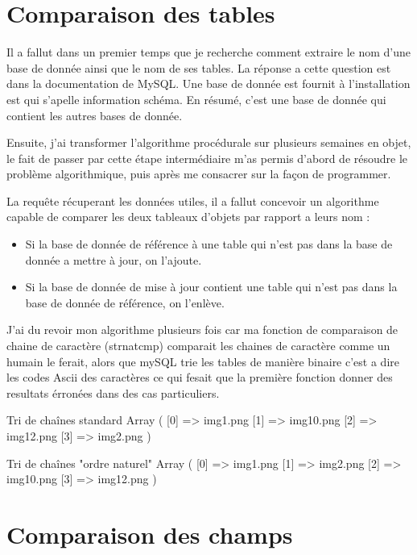 \section{Comparaison des tables}


Il a fallut dans un premier temps que je recherche comment extraire le nom
d'une base de donnée ainsi que le nom de ses tables. La réponse a cette
question est dans la documentation de MySQL. Une base de donnée est fournit à
l'installation est qui s'apelle information schéma. En résumé, c'est une base
de donnée qui contient les autres bases de donnée.

Ensuite, j'ai transformer l'algorithme procédurale sur plusieurs semaines en objet, le fait de passer par cette étape intermédiaire m'as permis d'abord de résoudre le
problème algorithmique, puis après me consacrer sur la façon de programmer.

La requête récuperant les données utiles, il a fallut concevoir un algorithme capable de comparer les deux tableaux d'objets par rapport a leurs nom :
\begin{itemize}
    \item Si la base de donnée de référence à une table qui n'est pas dans la base de donnée a mettre à jour, on l'ajoute.
    \item Si la base de donnée de mise à jour contient une table qui n'est pas dans la base de donnée de référence, on l'enlève.
\end{itemize}

J'ai du revoir mon algorithme plusieurs fois car ma fonction de comparaison de chaine de caractère (strnatcmp) comparait les chaines de caractère comme un humain le ferait,
alors que mySQL trie les tables de manière binaire c'est a dire les codes Ascii des caractères ce qui fesait que la première fonction donner des resultats érronées dans des
cas particuliers.

Tri de chaînes standard
Array
(
    [0] => img1.png
    [1] => img10.png
    [2] => img12.png
    [3] => img2.png
)

Tri de chaînes "ordre naturel"
Array
(
    [0] => img1.png
    [1] => img2.png
    [2] => img10.png
    [3] => img12.png
)

\section{Comparaison des champs}

